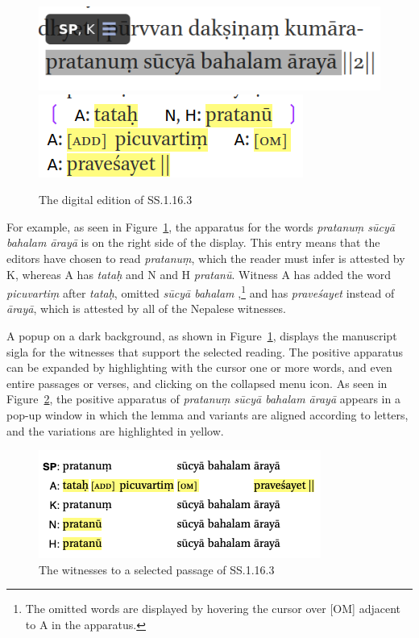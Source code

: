 \begin{figure}[t]
    \centering
    \includegraphics[draft=false,width=.5\textwidth]{media/SS.1.16.3c}
    \quad
    \includegraphics[draft=false,width=.35\textwidth]{media/SS.1.16.3d}
    \caption{The digital edition of SS.1.16.3}
    \label{SS.1.16}
\end{figure}
For example, as seen in Figure~\ref{SS.1.16}, the apparatus for the words 
\emph{pratanuṃ sūcyā bahalam ārayā} is on the right side of the display. 
This entry means that the editors have chosen to read 
\emph{pratanuṃ}, which the reader must infer is attested by K, whereas A has 
\emph{tataḥ} and N and H \emph{pratanū}. Witness A has added the word \emph{picuvartiṃ} after \emph{tataḥ}, omitted \emph{sūcyā bahalam },\footnote{The omitted words are displayed by hovering the cursor over [OM] adjacent to A in the apparatus.} and has \emph{praveśayet} instead of \emph{ārayā}, which is attested by all of the Nepalese witnesses. 

A popup on a dark background, as shown in Figure~\ref{SS.1.16}, displays the
manuscript sigla for the witnesses that support the selected reading.  The positive
apparatus can be expanded by highlighting with the cursor one or more words, and
even entire passages or verses, and clicking on the collapsed menu icon. As seen
in Figure~\ref{SS.1.16.3}, the positive apparatus of \emph{pratanuṃ sūcyā bahalam
    ārayā} appears in a pop-up window in which the lemma and variants are aligned
according to letters, and the variations are highlighted in yellow.

\begin{figure}[t]
    \centering
    \includegraphics[draft=false,width=.8\textwidth]{media/SS.1.16b.positive}
    \caption{The witnesses to a selected passage of SS.1.16.3}
    \label{SS.1.16.3}
\end{figure}


